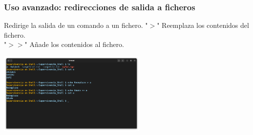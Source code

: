 \documentclass[10pt]{beamer}
\begin{document}
	\begin{frame}
		\frametitle{Uso avanzado: redirecciones de salida a ficheros}
		\begin{alertblock}{Redirige la salida de un comando a un fichero.}
			"$>$" Reemplaza los contenidos del fichero.\\
			"$>>$" Añade los contenidos al fichero.
		\end{alertblock}
		\begin{center}
			\includegraphics[width=0.55\textwidth]{redir}
		\end{center}
	\end{frame}	
\end{document}
